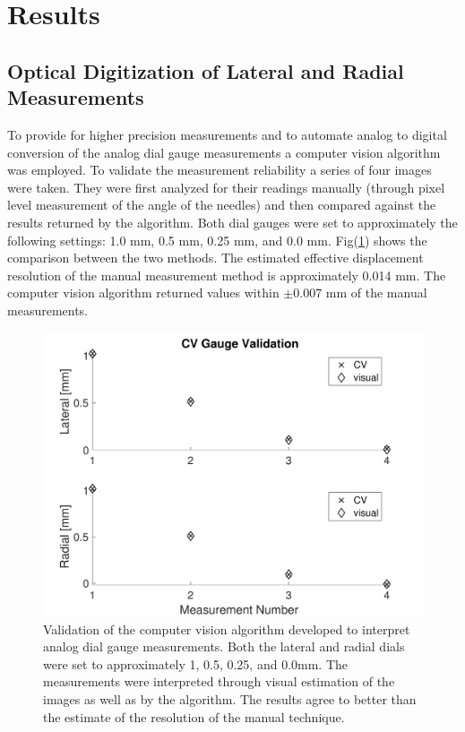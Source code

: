 \documentclass[journal]{IEEEtran}
\begin{document}
\section{Results}
\subsection{Optical Digitization of Lateral and Radial Measurements}
To provide for higher precision measurements and to automate analog to digital conversion of the analog dial gauge measurements a computer vision algorithm was employed.  To validate the measurement reliability a series of four images were taken.  They were first analyzed for their readings manually (through pixel level measurement of the angle of the needles) and then compared against the results returned by the algorithm.  Both dial gauges were set to approximately the following settings:  1.0 mm, 0.5 mm, 0.25 mm, and 0.0 mm.  Fig(\ref{fig:cv}) shows the comparison between the two methods.  The estimated effective displacement resolution of the manual measurement method is approximately 0.014 mm.  The computer vision algorithm returned values within $\pm$0.007 mm of the manual measurements. 
\begin{figure}[!t]
\centering
\includegraphics[width=3.25 in]{./figs/CV}
\caption{Validation of the computer vision algorithm developed to interpret analog dial gauge measurements.  Both the lateral and radial dials were set to approximately 1, 0.5, 0.25, and 0.0mm.  The measurements were interpreted through visual estimation of the images as well as by the algorithm. The results agree to better than the estimate of the resolution of the manual technique.}
\label{fig:cv}
\end{figure}
\end{document}
